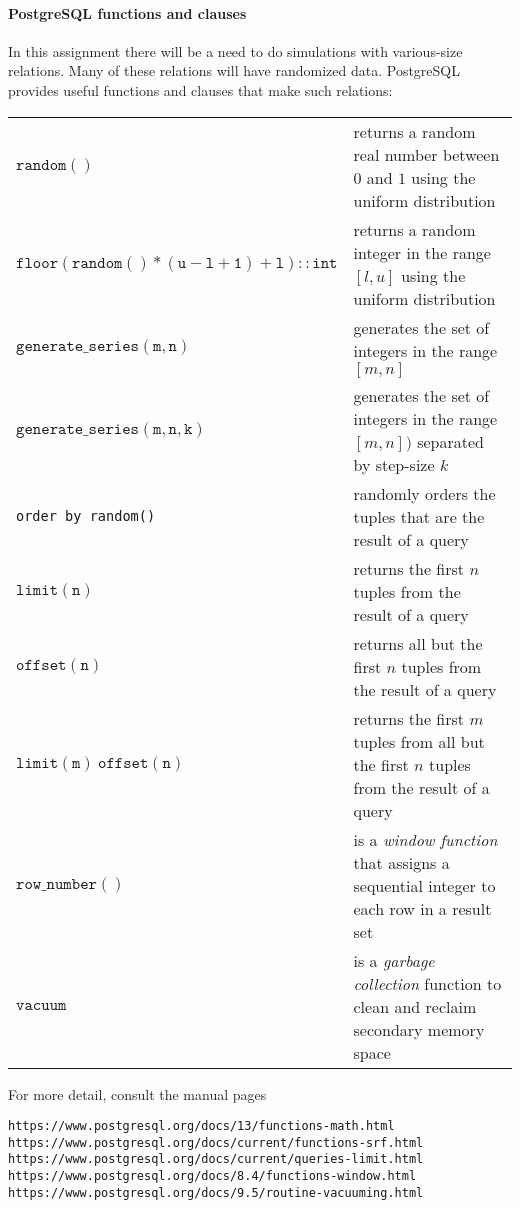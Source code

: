 \documentclass{article}
\begin{document}
\paragraph{PostgreSQL functions and clauses}

\medskip
In this assignment there will be a need to do simulations with various-size relations.   Many of these relations will have randomized data.
PostgreSQL provides useful functions and clauses that make such relations:

{\footnotesize
\begin{center}
\begin{tabular}{ll}
$\mathtt{random()}$ & returns a random real number between $0$ and $1$ using the uniform distribution\\
$\mathtt{floor(random() * (u-l+1) + l)::int}$ & returns a random integer in the range $[l,u]$ using the uniform distribution\\
$\mathtt{generate\_series(m,n)}$ & generates the set of integers in the range $[m,n]$\\
$\mathtt{generate\_series(m,n,k)}$ & generates the set of integers in the range $[m,n])$ separated by step-size $k$\\
{\tt order by random()} & randomly orders the tuples that are the result of a query\\
$\mathtt{limit(n)}$ & returns the first $n$ tuples from the result of a query \\ 
$\mathtt{offset(n)}$ & returns all but the first $n$ tuples from the result of a query \\
$\mathtt{limit(m)\ offset(n)}$ & returns the first $m$ tuples from all but the first $n$ tuples from the result of a query\\
$\mathtt{row\_number()}$& is a \emph{window function} that assigns a sequential integer to each row in a result set\\
$\mathtt{vacuum}$ & is a \emph{garbage collection} function to clean and reclaim secondary memory space
\end{tabular}
\end{center}
}
For more detail, consult the manual pages
\begin{alltt}
https://www.postgresql.org/docs/13/functions-math.html   
https://www.postgresql.org/docs/current/functions-srf.html   
https://www.postgresql.org/docs/current/queries-limit.html
https://www.postgresql.org/docs/8.4/functions-window.html
https://www.postgresql.org/docs/9.5/routine-vacuuming.html
\end{alltt}
\end{document}

